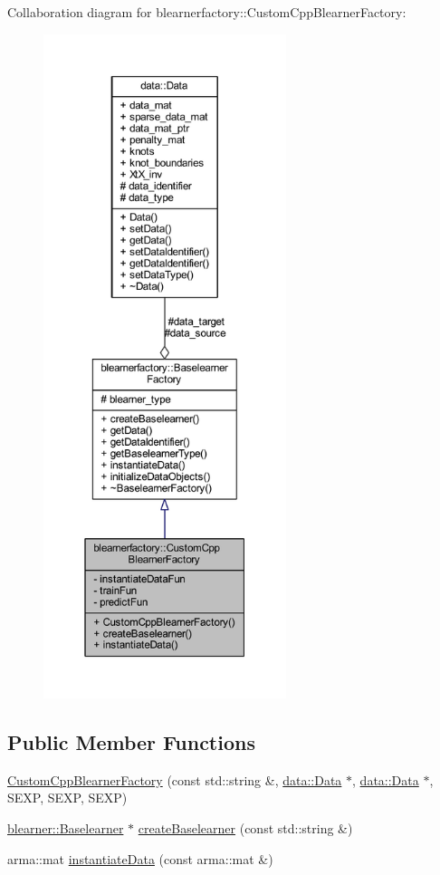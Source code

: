 Collaboration diagram for blearnerfactory\+:\+:Custom\+Cpp\+Blearner\+Factory\+:\nopagebreak
\begin{figure}[H]
\begin{center}
\leavevmode
\includegraphics[height=550pt]{classblearnerfactory_1_1_custom_cpp_blearner_factory__coll__graph}
\end{center}
\end{figure}
\subsection*{Public Member Functions}
\begin{DoxyCompactItemize}
\item 
\hyperlink{classblearnerfactory_1_1_custom_cpp_blearner_factory_a390de0fb001434b3252e5f723c55d7b3}{Custom\+Cpp\+Blearner\+Factory} (const std\+::string \&, \hyperlink{classdata_1_1_data}{data\+::\+Data} $\ast$, \hyperlink{classdata_1_1_data}{data\+::\+Data} $\ast$, S\+E\+XP, S\+E\+XP, S\+E\+XP)
\item 
\hyperlink{classblearner_1_1_baselearner}{blearner\+::\+Baselearner} $\ast$ \hyperlink{classblearnerfactory_1_1_custom_cpp_blearner_factory_ac98fae043e6822605261c7c6f7125e8c}{create\+Baselearner} (const std\+::string \&)
\item 
arma\+::mat \hyperlink{classblearnerfactory_1_1_custom_cpp_blearner_factory_abc9c251017197087af3ef8a1c0421969}{instantiate\+Data} (const arma\+::mat \&)
\end{DoxyCompactItemize}
